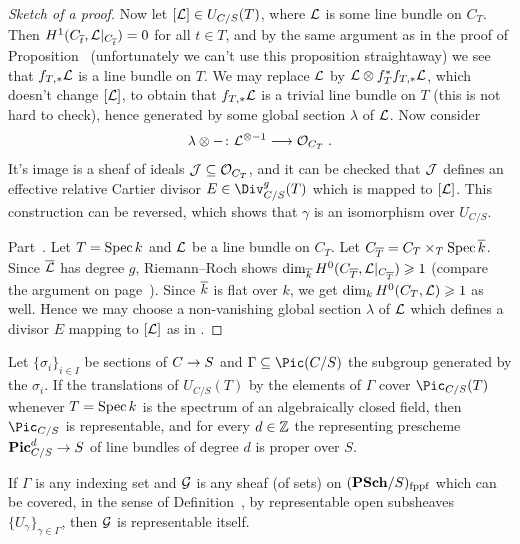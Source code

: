 \documentclass[a4paper,parskip=half,numbers=enddot, DIV=12]{scrreprt}
\renewcommand{\geq}{\geqslant}
\begin{document}
\begin{proof}[Sketch of a proof]
	Now let $[\mathcal{L}]\in U_{C/S}(T)$, where $\mathcal{L}$ is some line bundle on $C_T$. Then $H^1(C_{\overline{t}},\mathcal{L}|_{C_{\overline{t}}})=0$ for all $t\in T$, and by the same argument as in the proof of Proposition~ (unfortunately we can't use this proposition straightaway) we see that $f_{T,*}\mathcal{L}$ is a line bundle on $T$. We may replace $\mathcal{L}$ by $\mathcal{L}\otimes f_T^*f_{T,*}\mathcal{L}$, which doesn't change $[\mathcal{L}]$, to obtain that $f_{T,*}\mathcal{L}$ is a trivial line bundle on $T$ (this is not hard to check), hence generated by some global section $\lambda$ of $\mathcal{L}$. Now consider
	\begin{align*}
		\lambda\otimes -\colon \Ll^{\otimes -1}\morphism \Oo_{C_T}\;.
	\end{align*}
	It's image is a sheaf of ideals $\mathcal{J}\subseteq \mathcal{O}_{C_T}$, and it can be checked that $\mathcal{J}$ defines an effective relative Cartier divisor $E\in\Div_{C/S}^g(T)$ which is mapped to $[\mathcal{L}]$. This construction can be reversed, which shows that $\gamma$ is an isomorphism over $U_{C/S}$.
	
	Part~. Let $T=\operatorname{Spec} k$ and $\mathcal{L}$ be a line bundle on $C_T$. Let $C_{\overline{T}}=C_T\times_T\operatorname{Spec}\overline{k}$. Since $\overline{\mathcal{L}}$ has degree $g$, Riemann--Roch shows $\dim_{\ov{k}}H^0(C_{\ov{T}},\Ll|_{C_{\ov{T}}})\geq 1$ (compare the argument on page~\pageref{par:Strategy}). Since $\overline{k}$ is flat over $k$, we get $\dim_kH^0(C_T,\Ll)\geq 1$ as well. Hence we may choose a non-vanishing global section $\lambda$ of $\mathcal{L}$ which defines a divisor $E$ mapping to $[\mathcal{L}]$ as in .
\end{proof}
\begin{prop}
	\begin{alphanumerate}
		\item {}Let $\{\sigma_i\}_{i\in I}$ be sections of $C\morphism S$ and $\Gamma\subseteq \Pic(C/S)$ the subgroup generated by the $\sigma_i$. If the translations of $U_{C/S}(T)$ by the elements of $\Gamma$ cover $\Pic_{C/S}(T)$ whenever $T=\operatorname{Spec} k$ is the spectrum of an algebraically closed field, then $\Pic_{C/S}$ is representable, and for every $d\in \mathbb{Z}$ the representing prescheme $\PIC_{C/S}^d\morphism S$ of line bundles of degree $d$ is proper over $S$.
		\item If $\Gamma$ is any indexing set and $\mathcal{G}$ is any sheaf (of sets) on $(\cat{PSch}/S)_\fppf$ which can be covered, in the sense of Definition~, by representable open subsheaves $\{U_\gamma\}_{\gamma\in\Gamma}$, then $\mathcal{G}$ is representable itself.
	\end{alphanumerate}
\end{prop}
\end{document}
